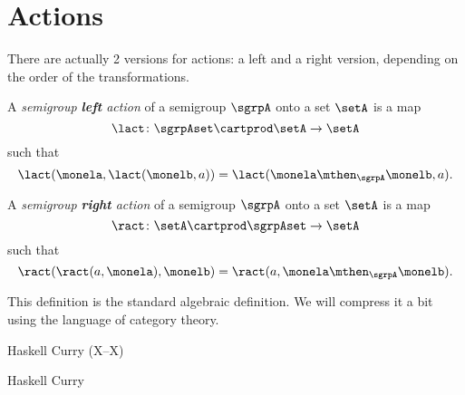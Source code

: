 

%


\section{Actions}

There are actually 2 versions for actions: a left and a right version, depending on the order of the transformations.


\begin{ctdefinition}\label{def:semigroup-left-action-prelim}
  A \emph{semigroup \textbf{left} action} of a semigroup $\sgrpA$ onto a set $\setA$ is a map
  \begin{equation}\label{eq:lact}
    \lact \colon \sgrpAset \cartprod \setA \to \setA
  \end{equation}
  such that
  \begin{equation}\label{eq:lact1cond}
    \lact(\monela, \lact(\monelb, a)) = \lact(\monela \mthen_\sgrpA \monelb, a).
  \end{equation}
\end{ctdefinition}


\begin{ctdefinition}\label{def:semigroup-right-action-prelim}
  A \emph{semigroup \textbf{right} action} of a semigroup $\sgrpA$ onto a set $\setA$ is a map
  \begin{equation}\label{eq:ract}
    \ract \colon \setA \cartprod \sgrpAset \to \setA
  \end{equation}
  such that
  \begin{equation}\label{eq:ract1cond}
    \ract(\ract(a, \monela), \monelb) = \ract(a, \monela \mthen_\sgrpA \monelb).
  \end{equation}
\end{ctdefinition}


This definition is the standard algebraic definition.
We will compress it a bit using the language of category theory.

\begin{marginfigure}
  \caption{Haskell Curry (X--X)}
  \label{fig:haskell-curry}
Haskell Curry
\end{marginfigure}

